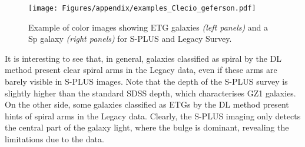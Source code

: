 \begin{figure}
\centering
\texttt{[image: Figures/appendix/examples\_Clecio\_geferson.pdf]}\\
    \caption{
    \label{fig:amb_comp}
    Example of color images showing  ETG galaxies {\it (left panels)} and a Sp galaxy {\it(right panels)} for S-PLUS and Legacy Survey. \\
    }
\end{figure}

It is interesting to see that, in general, galaxies classified as spiral by the DL method present clear spiral arms in the Legacy data, even if these arms are barely visible in S-PLUS images. Note that the depth of the S-PLUS survey is slightly higher than the standard SDSS depth, which characterises GZ1 galaxies. 
On the other side, some galaxies classified as ETGs by the DL method present hints of spiral arms in the Legacy data. Clearly, the S-PLUS imaging only detects the central part of the galaxy light, where the bulge is dominant, revealing the limitations due to the data.